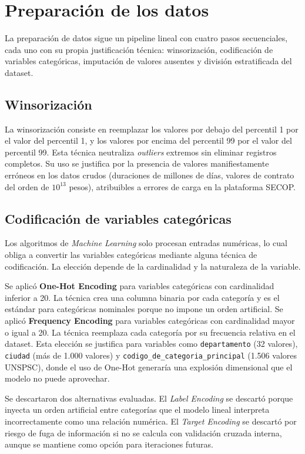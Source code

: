 \documentclass[12pt,letterpaper,oneside]{report}
\begin{document}
\section{Preparación de los datos}

La preparación de datos sigue un pipeline lineal con cuatro pasos
secuenciales, cada uno con su propia justificación técnica: winsorización,
codificación de variables categóricas, imputación de valores ausentes y
división estratificada del dataset.

\subsection{Winsorización}

La winsorización consiste en reemplazar los valores por debajo del percentil 1
por el valor del percentil 1, y los valores por encima del percentil 99 por
el valor del percentil 99. Esta técnica neutraliza \emph{outliers} extremos
sin eliminar registros completos. Su uso se justifica por la presencia de
valores manifiestamente erróneos en los datos crudos (duraciones de millones
de días, valores de contrato del orden de $10^{13}$ pesos), atribuibles a
errores de carga en la plataforma SECOP.

\subsection{Codificación de variables categóricas}

Los algoritmos de \emph{Machine Learning} solo procesan entradas numéricas, lo
cual obliga a convertir las variables categóricas mediante alguna técnica de
codificación. La elección depende de la cardinalidad y la naturaleza de la
variable.

Se aplicó \textbf{One-Hot Encoding} para variables categóricas con
cardinalidad inferior a 20. La técnica crea una columna binaria por cada
categoría y es el estándar para categóricas nominales porque no impone un
orden artificial. Se aplicó \textbf{Frequency Encoding} para variables
categóricas con cardinalidad mayor o igual a 20. La técnica reemplaza cada
categoría por su frecuencia relativa en el dataset. Esta elección se justifica
para variables como \texttt{departamento} (32 valores), \texttt{ciudad} (más
de 1.000 valores) y \texttt{codigo\_de\_categoria\_principal} (1.506 valores
UNSPSC), donde el uso de One-Hot generaría una explosión dimensional que el
modelo no puede aprovechar.

Se descartaron dos alternativas evaluadas. El \emph{Label Encoding} se
descartó porque inyecta un orden artificial entre categorías que el modelo
lineal interpreta incorrectamente como una relación numérica. El \emph{Target
Encoding} se descartó por riesgo de fuga de información si no se calcula con
validación cruzada interna, aunque se mantiene como opción para iteraciones
futuras.
\end{document}
